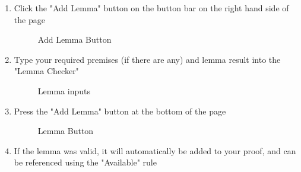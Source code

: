 \begin{enumerate}
	\item Click the "Add Lemma" button on the button bar on the right hand side of the page
	
	\begin{figure}[!ht]
		\centering
		\caption{Add Lemma Button}
	\end{figure}

	\item Type your required premises (if there are any) and lemma result into the "Lemma Checker"
	
	\begin{figure}[!ht]
		\centering
		\caption{Lemma inputs}
	\end{figure}

	\item Press the "Add Lemma" button at the bottom of the page
	
	\begin{figure}[!ht]
		\centering
		\caption{Lemma Button}
	\end{figure}

	\item If the lemma was valid, it will automatically be added to your proof, and can be referenced using the "Available" rule
	
\end{enumerate}

